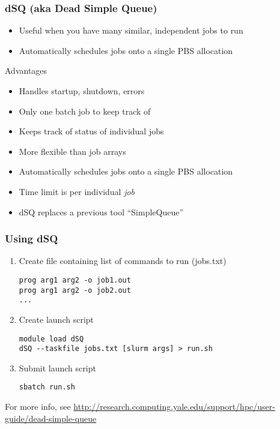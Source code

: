 \documentclass[10pt]{beamer}
\begin{document}
\begin{frame}[fragile]
\frametitle{dSQ (aka Dead Simple Queue)}

\begin{itemize}
\item Useful when you have many similar, independent jobs to run
\item Automatically schedules jobs onto a single PBS allocation
\end{itemize}

Advantages

\begin{itemize}
\item Handles startup, shutdown, errors
\item Only one batch job to keep track of
\item Keeps track of status of individual jobs
\item More flexible than job arrays
\item Automatically schedules jobs onto a single PBS allocation
\item Time limit is per individual \em{job}
\item dSQ replaces a previous tool ``SimpleQueue''
\end{itemize}

\end{frame}

\begin{frame}[fragile]
\frametitle{Using dSQ}

\begin{enumerate}
\item Create file containing list of commands to run (jobs.txt)
\begin{verbatim}
prog arg1 arg2 -o job1.out  
prog arg1 arg2 -o job2.out  
...
\end{verbatim}
\item Create launch script
\begin{verbatim}
module load dSQ
dSQ --taskfile jobs.txt [slurm args] > run.sh
\end{verbatim}

\item Submit launch script
\begin{verbatim}
sbatch run.sh  
\end{verbatim}
\end{enumerate}

For more info, see \url{http://research.computing.yale.edu/support/hpc/user-guide/dead-simple-queue}

\end{frame}
\end{document}
